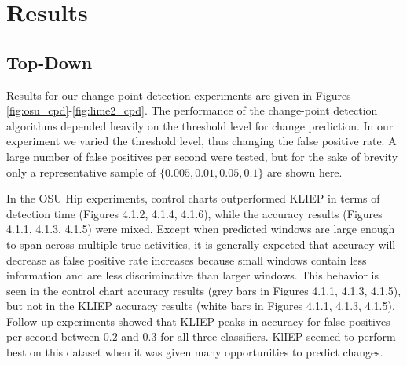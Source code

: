 \chapter{Results}
%

\section{Top-Down}
\label{sec:cpd_results}

Results for our change-point detection experiments are given in
Figures \ref{fig:osu_cpd}-\ref{fig:lime2_cpd}.
The performance of the change-point detection algorithms
depended heavily on the threshold level for change prediction. In our
experiment we varied the threshold level, thus changing the false positive
rate. A large number of false positives per
second were tested, but for the sake of brevity only a representative sample
of $\{0.005, 0.01, 0.05, 0.1\}$ are shown here.

In the OSU Hip experiments, control charts outperformed KLIEP in terms of
detection time (Figures 4.1.2, 4.1.4, 4.1.6), while the accuracy results 
(Figures 4.1.1, 4.1.3, 4.1.5) were
mixed. Except when predicted windows are large enough to span across multiple
true activities, it is generally expected that accuracy will decrease as false
positive rate increases because small windows contain less information and are
less discriminative than larger windows. This behavior is seen in the control chart
accuracy results (grey bars in Figures 4.1.1, 4.1.3, 4.1.5), but not in the
KLIEP accuracy results (white bars in Figures 4.1.1, 4.1.3, 4.1.5).
Follow-up experiments showed that KLIEP peaks in accuracy for
false positives per second between $0.2$ and $0.3$ for all three classifiers.
KlIEP seemed to perform best on this dataset when it was given many
opportunities to predict changes.

